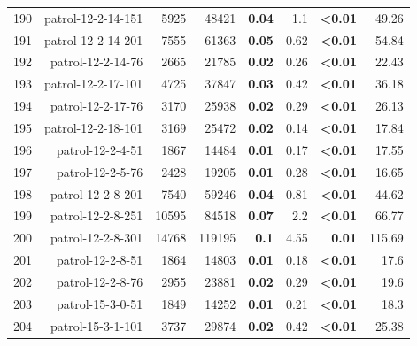 \begin{longtable}{lrr@{\hskip 12pt}r@{\hskip 12pt}r@{\hskip 12pt}r@{\hskip 12pt}r@{\hskip 12pt}r}
190 & \multirow{1}{*}{patrol-12-2-14-151} & \multirow{1}{*}{5925} & \multirow{1}{*}{48421} & \textbf{0.04} & 1.1 & \textbf{<0.01} & 49.26 \\
191 & \multirow{1}{*}{patrol-12-2-14-201} & \multirow{1}{*}{7555} & \multirow{1}{*}{61363} & \textbf{0.05} & 0.62 & \textbf{<0.01} & 54.84 \\
192 & \multirow{1}{*}{patrol-12-2-14-76} & \multirow{1}{*}{2665} & \multirow{1}{*}{21785} & \textbf{0.02} & 0.26 & \textbf{<0.01} & 22.43 \\
193 & \multirow{1}{*}{patrol-12-2-17-101} & \multirow{1}{*}{4725} & \multirow{1}{*}{37847} & \textbf{0.03} & 0.42 & \textbf{<0.01} & 36.18 \\
194 & \multirow{1}{*}{patrol-12-2-17-76} & \multirow{1}{*}{3170} & \multirow{1}{*}{25938} & \textbf{0.02} & 0.29 & \textbf{<0.01} & 26.13 \\
195 & \multirow{1}{*}{patrol-12-2-18-101} & \multirow{1}{*}{3169} & \multirow{1}{*}{25472} & \textbf{0.02} & 0.14 & \textbf{<0.01} & 17.84 \\
196 & \multirow{1}{*}{patrol-12-2-4-51} & \multirow{1}{*}{1867} & \multirow{1}{*}{14484} & \textbf{0.01} & 0.17 & \textbf{<0.01} & 17.55 \\
197 & \multirow{1}{*}{patrol-12-2-5-76} & \multirow{1}{*}{2428} & \multirow{1}{*}{19205} & \textbf{0.01} & 0.28 & \textbf{<0.01} & 16.65 \\
198 & \multirow{1}{*}{patrol-12-2-8-201} & \multirow{1}{*}{7540} & \multirow{1}{*}{59246} & \textbf{0.04} & 0.81 & \textbf{<0.01} & 44.62 \\
199 & \multirow{1}{*}{patrol-12-2-8-251} & \multirow{1}{*}{10595} & \multirow{1}{*}{84518} & \textbf{0.07} & 2.2 & \textbf{<0.01} & 66.77 \\
200 & \multirow{1}{*}{patrol-12-2-8-301} & \multirow{1}{*}{14768} & \multirow{1}{*}{119195} & \textbf{0.1} & 4.55 & \textbf{0.01} & 115.69 \\
201 & \multirow{1}{*}{patrol-12-2-8-51} & \multirow{1}{*}{1864} & \multirow{1}{*}{14803} & \textbf{0.01} & 0.18 & \textbf{<0.01} & 17.6 \\
202 & \multirow{1}{*}{patrol-12-2-8-76} & \multirow{1}{*}{2955} & \multirow{1}{*}{23881} & \textbf{0.02} & 0.29 & \textbf{<0.01} & 19.6 \\
203 & \multirow{1}{*}{patrol-15-3-0-51} & \multirow{1}{*}{1849} & \multirow{1}{*}{14252} & \textbf{0.01} & 0.21 & \textbf{<0.01} & 18.3 \\
204 & \multirow{1}{*}{patrol-15-3-1-101} & \multirow{1}{*}{3737} & \multirow{1}{*}{29874} & \textbf{0.02} & 0.42 & \textbf{<0.01} & 25.38 \\

\end{longtable}

